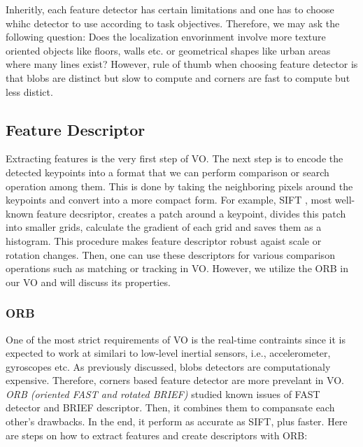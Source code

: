 \documentclass[a4paper]{report}
\numberwithin{figure}{section}
\begin{document}
Inheritly, each feature detector has certain limitations and one has to 
choose whihc detector to use according to task objectives. Therefore, we may ask 
the following question: 
Does the localization envorinment involve more texture oriented objects like 
floors, walls etc. or geometrical shapes like urban areas where many lines 
exist?
However, rule of thumb when choosing feature detector is that blobs 
are distinct but slow to compute and corners are fast to compute but less 
distict. 

\subsection{Feature Descriptor} \label{sb_sc_feature_descriptor}

Extracting features is the very first step of VO. The next step is to 
encode the detected keypoints into a format that we can perform comparison 
or search operation among them. This is done by taking the neighboring pixels 
around the keypoints and convert into a more compact form. For example, SIFT 
, most well-known feature decsriptor, 
creates a patch around a keypoint, divides this patch into smaller grids,
calculate the gradient of each grid and 
saves them as a histogram.
This procedure makes feature descriptor 
robust agaist scale or rotation changes. Then, one can use these descriptors for 
various comparison operations such as matching or tracking in VO. However, we 
utilize the ORB in our VO and will discuss its properties.


\subsubsection{ORB} \label{sb_sc_orb}

One of the most strict requirements of VO is the real-time contraints since it is 
expected to work at similari to low-level inertial sensors, i.e., accelerometer, gyroscopes etc. 
As previously discussed, blobs detectors are computationaly expensive. Therefore, 
corners based feature detector are more prevelant in VO. 
\textit{ORB (oriented FAST and rotated BRIEF)} studied known issues of 
FAST detector and BRIEF descriptor. Then, it combines them to compansate each 
other's drawbacks. In the end,
it perform as accurate as SIFT, plus faster. Here are steps on how to extract features 
and create descriptors with ORB: 
\end{document}
